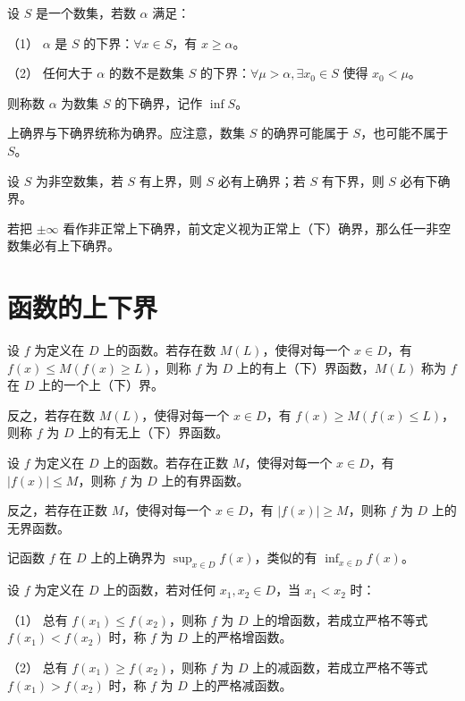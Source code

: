 \begin{definition}[下确界]
	设 $S$ 是一个数集，若数 $\alpha$ 满足：
	
	（1） $\alpha$ 是 $S$ 的下界：$\forall x\in S$，有 $x\geqslant \alpha$。
	
	（2） 任何大于 $\alpha$ 的数不是数集 $S$ 的下界：$\forall \mu>\alpha, \exists x_0\in S$ 使得 $x_0<\mu$。
	
	则称数 $\alpha$ 为数集 $S$ 的下确界，记作 $\inf S$。
\end{definition}

上确界与下确界统称为确界。应注意，数集 $S$ 的确界可能属于 $S$，也可能不属于 $S$。

\begin{theorem}[确界原理]
	设 $S$ 为非空数集，若 $S$ 有上界，则 $S$ 必有上确界；若 $S$ 有下界，则 $S$ 必有下确界。
\end{theorem}

若把 $\pm \infty$ 看作非正常上下确界，前文定义视为正常上（下）确界，那么任一非空数集必有上下确界。

\section{函数的上下界}

\begin{definition}
	设 $f$ 为定义在 $D$ 上的函数。若存在数 $M(L)$，使得对每一个 $x\in D$，有 $f(x)\leqslant M(f(x) \ge L)$，则称 $f$ 为 $D$ 上的有上（下）界函数，$M(L)$ 称为 $f$ 在 $D$ 上的一个上（下）界。

	反之，若存在数 $M(L)$，使得对每一个 $x\in D$，有 $f(x)\geqslant M(f(x) \leqslant L)$，则称 $f$ 为 $D$ 上的有无上（下）界函数。
\end{definition}

\begin{definition}
	设 $f$ 为定义在 $D$ 上的函数。若存在正数 $M$，使得对每一个 $x\in D$，有 $|f(x)|\leqslant M$，则称 $f$ 为 $D$ 上的有界函数。

	反之，若存在正数 $M$，使得对每一个 $x\in D$，有 $|f(x)|\ge M$，则称 $f$ 为 $D$ 上的无界函数。
\end{definition}

记函数 $f$ 在 $D$ 上的上确界为 $\sup_{x\in D} f(x)$，类似的有 $\inf_{x\in D} f(x)$。

\begin{definition}
	设 $f$ 为定义在 $D$ 上的函数，若对任何 $x_1,x_2\in D$，当 $x_1<x_2$ 时：

	（1） 总有 $f(x_1) \leqslant f(x_2)$，则称 $f$ 为 $D$ 上的增函数，若成立严格不等式 $f(x_1) < f(x_2)$ 时，称 $f$ 为 $D$ 上的严格增函数。

	（2） 总有 $f(x_1) \geqslant f(x_2)$，则称 $f$ 为 $D$ 上的减函数，若成立严格不等式 $f(x_1) > f(x_2)$ 时，称 $f$ 为 $D$ 上的严格减函数。
\end{definition}

